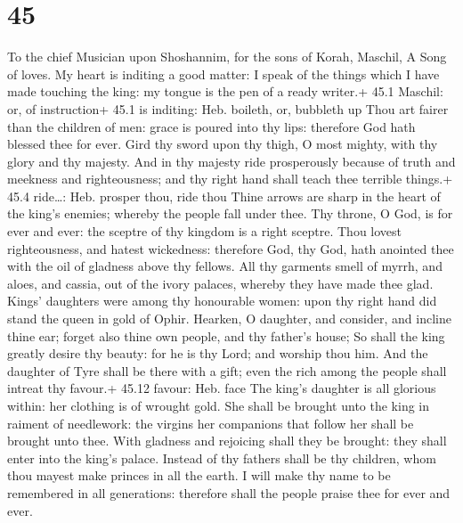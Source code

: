 \hypertarget{section-44}{%
\section{45}\label{section-44}}

To the chief Musician upon Shoshannim, for the sons of Korah, Maschil, A
Song of loves.  My heart is inditing a good matter: I speak
of the things which I have made touching the king: my tongue is the pen
of a ready writer.+ 45.1 Maschil: or, of instruction+ 45.1 is inditing:
Heb. boileth, or, bubbleth up  Thou art fairer than the
children of men: grace is poured into thy lips: therefore God hath
blessed thee for ever.  Gird thy sword upon thy thigh, O
most mighty, with thy glory and thy majesty.  And in thy
majesty ride prosperously because of truth and meekness and
righteousness; and thy right hand shall teach thee terrible things.+
45.4 ride\ldots: Heb. prosper thou, ride thou  Thine arrows
are sharp in the heart of the king's enemies; whereby the people fall
under thee.  Thy throne, O God, is for ever and ever: the
sceptre of thy kingdom is a right sceptre.  Thou lovest
righteousness, and hatest wickedness: therefore God, thy God, hath
anointed thee with the oil of gladness above thy fellows. 
All thy garments smell of myrrh, and aloes, and cassia, out of the ivory
palaces, whereby they have made thee glad.  Kings' daughters
were among thy honourable women: upon thy right hand did stand the queen
in gold of Ophir.  Hearken, O daughter, and consider, and
incline thine ear; forget also thine own people, and thy father's house;
 So shall the king greatly desire thy beauty: for he is thy
Lord; and worship thou him.  And the daughter of Tyre shall
be there with a gift; even the rich among the people shall intreat thy
favour.+ 45.12 favour: Heb. face  The king's daughter is
all glorious within: her clothing is of wrought gold.  She
shall be brought unto the king in raiment of needlework: the virgins her
companions that follow her shall be brought unto thee. 
With gladness and rejoicing shall they be brought: they shall enter into
the king's palace.  Instead of thy fathers shall be thy
children, whom thou mayest make princes in all the earth. 
I will make thy name to be remembered in all generations: therefore
shall the people praise thee for ever and ever.

